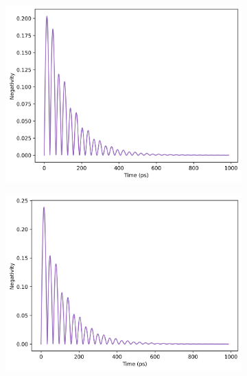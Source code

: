 \documentclass[11pt]{article}
\begin{document}
\begin{figure}[H]
    \centering
    \begin{subfigure}{0.45\textwidth}
        \centering
        \includegraphics[width=0.85\linewidth]{Research Project/Code/results/JCM/OQS_Neg_Spont_eg.png}
        \caption{}
        \label{fig:jcm_cqs_expt_eg}
    \end{subfigure}
    \hfill
    \begin{subfigure}{0.45\textwidth}
        \centering
        \includegraphics[width=0.85\linewidth]{Research Project/Code/results/JCM/OQS_Neg_Therm_eg.png}
        \caption{}
        \label{fig:jcm_cqs_vne_eg}
    \end{subfigure}
    
    \vspace{0.5cm}
    

\end{figure}
\end{document}
